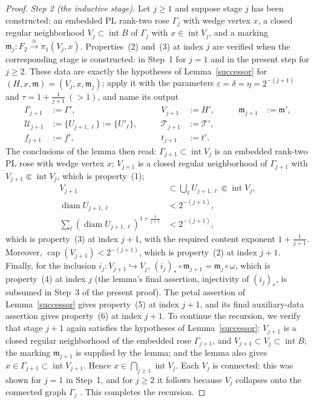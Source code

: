 \documentclass[12pt,oneside,a4paper]{article}
\theoremstyle{mytheorem}
\theoremstyle{remark}
\theoremstyle{definition}
\begin{document}
\begin{proof}
\smallskip\noindent\emph{Step 2 (the inductive stage).}
Let $j\ge1$ and suppose stage $j$ has been constructed: an embedded PL
rank-two rose $\Gamma_j$ with wedge vertex $x$, a closed regular neighborhood
$V_j\subset\operatorname{int}B$ of $\Gamma_j$ with $x\in\operatorname{int}V_j$, and a marking
$\mathfrak{m}_j:F_2\xrightarrow{\cong}\pi_1(V_j,x)$.  Properties~(2) and~(3) at
index $j$ are verified when the corresponding stage is constructed: in
Step~1 for $j=1$ and in the present step for $j\geq2$.  These data are
exactly the hypotheses
of Lemma~\ref{successor} for $(H,x,\mathfrak{m})=(V_j,x,\mathfrak{m}_j)$; apply it with the
parameters
\(\varepsilon=\delta=\eta=2^{-(j+1)}\)
and \(\tau=1+\tfrac1{j+1}\ (>1)\),
and name its output
\[
\begin{aligned}
\Gamma_{j+1}&:=\Gamma',
&\qquad V_{j+1}&:=H',
&\qquad \mathfrak{m}_{j+1}&:=\mathfrak{m}',\\
\mathcal{U}_{j+1}&:=\{U_{j+1,\ell}\}:=\{U'_\ell\},
&\qquad \mathcal{T}_{j+1}&:=\mathcal{T}',\\
f_{j+1}&:=f',
&\qquad t_{j+1}&:=t'.
\end{aligned}
\]
The conclusions of the lemma then read: $\Gamma_{j+1}\subset
\operatorname{int}V_j$ is an embedded rank-two PL rose with wedge vertex $x$;
$V_{j+1}$ is a closed regular neighborhood of $\Gamma_{j+1}$ with
$V_{j+1}\Subset\operatorname{int}V_j$, which is property~(1);
\[
\begin{aligned}
V_{j+1}&\subset\bigcup_\ell U_{j+1,\ell}
          \Subset\operatorname{int}V_j,\\
\operatorname{diam}U_{j+1,\ell}&<2^{-(j+1)},\\
\sum_\ell(\operatorname{diam}U_{j+1,\ell})^{1+\frac1{j+1}}
  &<2^{-(j+1)},
\end{aligned}
\]
which is property~(3) at index $j+1$, with the required content exponent
$1+\frac1{j+1}$.  Moreover,
$\operatorname{cap}(V_{j+1})<2^{-(j+1)}$, which is property~(2) at index
$j+1$.  Finally, for the inclusion
$i_j:V_{j+1}\hookrightarrow V_j$,
\((i_j)_*\circ\mathfrak{m}_{j+1}=\mathfrak{m}_j\circ\omega\),
which is property~(4) at index $j$ (the lemma's final assertion, injectivity
of $(i_j)_*$, is subsumed in Step~3 of the present proof).  The petal assertion of
Lemma~\ref{successor} gives property~\textup{(5)} at index $j+1$, and
its final auxiliary-data assertion gives property~\textup{(6)} at index
$j+1$.  To continue the recursion, we verify
that stage $j+1$ again satisfies the hypotheses of Lemma~\ref{successor}:
$V_{j+1}$ is a closed regular neighborhood of the embedded rose
$\Gamma_{j+1}$, and
$V_{j+1}\subset V_j\subset\operatorname{int}B$; the marking
$\mathfrak{m}_{j+1}$ is supplied by the lemma; and the lemma also gives
$x\in\Gamma_{j+1}\subset\operatorname{int}V_{j+1}$.  Hence
$x\in\bigcap_{j\geq1}\operatorname{int}V_j$.  Each $V_j$ is connected:
this was shown for $j=1$ in Step~1, and for $j\geq2$ it follows because
$V_j$ collapses onto the connected graph $\Gamma_j$
\cite[Theorem~3.16]{zbMATH01714503}.  This completes the recursion.


\end{proof}
\end{document}
